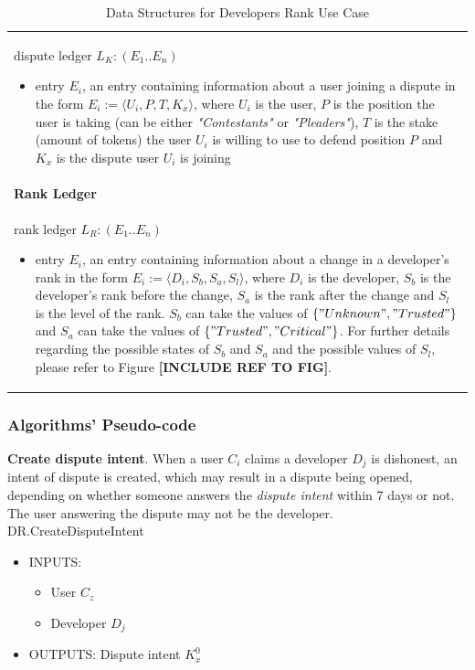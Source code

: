 \begin{table}[H]
\begin{tabular}{|p{}|}
dispute ledger $L_{K} : (E_1..E_n)$
\begin{itemize}
	\item entry $E_i$, an entry containing information about a user joining a dispute in the form $E_i := \langle U_i, P, T, K_x\rangle$, where $U_i$ is the user, $P$ is the position the user is taking (can be either \textit{"Contestants"} or \textit{"Pleaders"}), $T$ is the stake (amount of tokens) the user $U_i$ is willing to use to defend position $P$ and $K_x$ is the dispute user $U_i$ is joining
\end{itemize} \\
\textbf{Rank Ledger} \\
rank ledger $L_{R} : (E_1..E_n)$
\begin{itemize}
	\item entry $E_i$, an entry containing information about a change in a developer's rank in the form $E_i := \langle D_i, S_b, S_a, S_l\rangle$, where $D_i$ is the developer, $S_b$ is the developer's rank before the change, $S_a$ is the rank after the change and $S_l$ is the level of the rank. $S_b$ can take the values of $\{"Unknown", "Trusted"\}$ and $S_a$ can take the values of $\{"Trusted", "Critical"\}$. For further details regarding the possible states of $S_b$ and $S_a$ and the possible values of $S_l$, please refer to Figure \textbf{[INCLUDE REF TO FIG]}.
\end{itemize} \\
\hline
\end{tabular}
\caption{Data Structures for Developers Rank Use Case}
\label{table: data_structures_da}
\end{table}


\subsubsection{Algorithms' Pseudo-code}

\noindent \textbf{Create dispute intent}. When a user $C_i$ claims a developer $D_j$ is dishonest, an intent of dispute is created, which may result in a dispute being opened, depending on whether someone answers the \textit{dispute intent} within 7 days or not. The user answering the dispute may not be the developer. \\

\textsf{DR.CreateDisputeIntent}
\begin{itemize}
	\item INPUTS:
	\begin{itemize}
		\item User $C_z$
		\item Developer $D_j$
	\end{itemize}
	\item OUTPUTS: Dispute intent $K^{0}_{x}$
\end{itemize}


